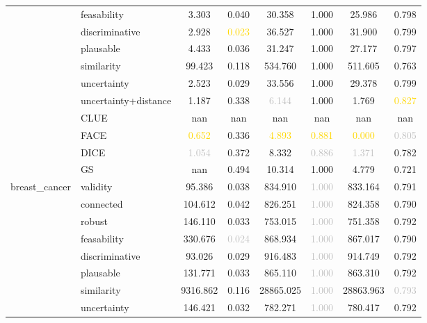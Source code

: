 \begin{table}[ht]
\begin{tabular}{l l c c c c c c}
 & feasability & 3.303 & 0.040 & 30.358 & \textcolor{bronze}{1.000} & 25.986 & 0.798 \\
 & discriminative & 2.928 & \textcolor{gold}{0.023} & 36.527 & \textcolor{bronze}{1.000} & 31.900 & 0.799 \\
 & plausable & 4.433 & 0.036 & 31.247 & \textcolor{bronze}{1.000} & 27.177 & 0.797 \\
 & similarity & 99.423 & 0.118 & 534.760 & \textcolor{bronze}{1.000} & 511.605 & 0.763 \\
 & uncertainty & 2.523 & 0.029 & 33.556 & \textcolor{bronze}{1.000} & 29.378 & \textcolor{bronze}{0.799} \\
 & uncertainty+distance & \textcolor{bronze}{1.187} & 0.338 & \textcolor{silver}{6.144} & \textcolor{bronze}{1.000} & \textcolor{bronze}{1.769} & \textcolor{gold}{0.827} \\
 & CLUE & nan & nan & nan & nan & nan & nan \\
 & FACE & \textcolor{gold}{0.652} & 0.336 & \textcolor{gold}{4.893} & \textcolor{gold}{0.881} & \textcolor{gold}{0.000} & \textcolor{silver}{0.805} \\
 & DICE & \textcolor{silver}{1.054} & 0.372 & \textcolor{bronze}{8.332} & \textcolor{silver}{0.886} & \textcolor{silver}{1.371} & 0.782 \\
 & GS & nan & 0.494 & 10.314 & \textcolor{bronze}{1.000} & 4.779 & 0.721 \\
\hline
\multirow{13}{*}{breast_cancer} & validity & 95.386 & 0.038 & 834.910 & \textcolor{silver}{1.000} & 833.164 & 0.791 \\
 & connected & 104.612 & 0.042 & 826.251 & \textcolor{silver}{1.000} & 824.358 & 0.790 \\
 & robust & 146.110 & 0.033 & 753.015 & \textcolor{silver}{1.000} & 751.358 & 0.792 \\
 & feasability & 330.676 & \textcolor{silver}{0.024} & 868.934 & \textcolor{silver}{1.000} & 867.017 & 0.790 \\
 & discriminative & \textcolor{bronze}{93.026} & \textcolor{bronze}{0.029} & 916.483 & \textcolor{silver}{1.000} & 914.749 & 0.792 \\
 & plausable & 131.771 & 0.033 & 865.110 & \textcolor{silver}{1.000} & 863.310 & 0.792 \\
 & similarity & 9316.862 & 0.116 & 28865.025 & \textcolor{silver}{1.000} & 28863.963 & \textcolor{silver}{0.793} \\
 & uncertainty & 146.421 & 0.032 & 782.271 & \textcolor{silver}{1.000} & 780.417 & 0.792 \\

\end{tabular}
\end{table}
